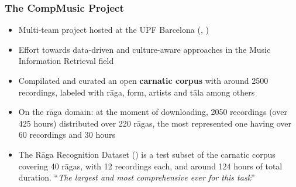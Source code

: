 \documentclass[hyperref={pdfpagelabels=false}]{beamer}
\begin{document}
     \begin{frame}
       \frametitle{The CompMusic Project}
       \begin{itemize}
       \item Multi-team project hosted at the UPF Barcelona (\cite{serra-comp11}, \cite{serra-comp14})
       \item Effort towards data-driven and culture-aware approaches in the Music Information Retrieval field
       \item Compilated and curated an open \textbf{carnatic corpus} with around 2500 recordings, labeled with r\=aga, form, artists and t\=ala among others\cite{indian-corpora}
       \item On the r\=aga domain: at the moment of downloading, 2050 recordings (over 425 hours) distributed over 220 r\=agas, the most represented one having over 60 recordings and 30 hours
       \item     The R\=aga Recognition Dataset () is a test subset of the carnatic corpus covering 40 r\=agas, with 12 recordings each, and around 124 hours of total duration\cite[p.84]{gulati}. ``{\it The largest and most comprehensive ever for this task}''\cite[p.183]{gulati}
       \end{itemize}


     \end{frame}
\end{document}

